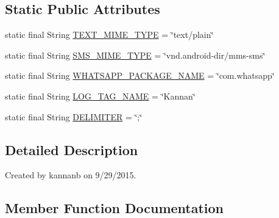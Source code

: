\subsection*{Static Public Attributes}
\begin{DoxyCompactItemize}
\item 
static final String \hyperlink{classcourse_1_1examples_1_1phoneapp_1_1_utility_a35835b9e24f4150c50657a03448919da}{T\+E\+X\+T\+\_\+\+M\+I\+M\+E\+\_\+\+T\+Y\+P\+E} = \char`\"{}text/plain\char`\"{}
\item 
static final String \hyperlink{classcourse_1_1examples_1_1phoneapp_1_1_utility_a6b677db05046c2fcb1b6770f39bf35f2}{S\+M\+S\+\_\+\+M\+I\+M\+E\+\_\+\+T\+Y\+P\+E} = \char`\"{}vnd.\+android-\/dir/mms-\/sms\char`\"{}
\item 
static final String \hyperlink{classcourse_1_1examples_1_1phoneapp_1_1_utility_ade5eb8c8a3772fbacb49d38f450ca9b5}{W\+H\+A\+T\+S\+A\+P\+P\+\_\+\+P\+A\+C\+K\+A\+G\+E\+\_\+\+N\+A\+M\+E} = \char`\"{}com.\+whatsapp\char`\"{}
\item 
static final String \hyperlink{classcourse_1_1examples_1_1phoneapp_1_1_utility_a91b350654a317da65ecc2bebda4129f7}{L\+O\+G\+\_\+\+T\+A\+G\+\_\+\+N\+A\+M\+E} = \char`\"{}Kannan\char`\"{}
\item 
static final String \hyperlink{classcourse_1_1examples_1_1phoneapp_1_1_utility_a7712af7f884a75deb1272dddc4bf5dc9}{D\+E\+L\+I\+M\+I\+T\+E\+R} = \char`\"{};\char`\"{}
\end{DoxyCompactItemize}


\subsection{Detailed Description}
Created by kannanb on 9/29/2015. 

\subsection{Member Function Documentation}
\hypertarget{classcourse_1_1examples_1_1phoneapp_1_1_utility_a52a9f17fcb5689b3da8038811ee6abf4}{}
